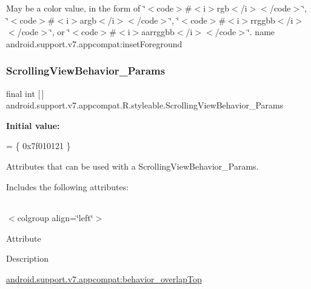 May be a color value, in the form of \char`\"{}$<$code$>$\#$<$i$>$rgb$<$/i$>$$<$/code$>$\char`\"{}, \char`\"{}$<$code$>$\#$<$i$>$argb$<$/i$>$$<$/code$>$\char`\"{}, \char`\"{}$<$code$>$\#$<$i$>$rrggbb$<$/i$>$$<$/code$>$\char`\"{}, or \char`\"{}$<$code$>$\#$<$i$>$aarrggbb$<$/i$>$$<$/code$>$\char`\"{}.  name android.\+support.\+v7.\+appcompat\+:inset\+Foreground \mbox{\label{classandroid_1_1support_1_1v7_1_1appcompat_1_1R_1_1styleable_a0f3b26fd53511c29976d0f2c70a6b4f4}} 
\subsubsection{\texorpdfstring{Scrolling\+View\+Behavior\+\_\+\+Params}{ScrollingViewBehavior\_Params}}
{\footnotesize\ttfamily final int \mbox{[}$\,$\mbox{]} android.\+support.\+v7.\+appcompat.\+R.\+styleable.\+Scrolling\+View\+Behavior\+\_\+\+Params\hspace{0.3cm}{\ttfamily [static]}}

{\bfseries Initial value\+:}
\begin{DoxyCode}
= \{
            0x7f010121
        \}
\end{DoxyCode}
Attributes that can be used with a Scrolling\+View\+Behavior\+\_\+\+Params. 

Includes the following attributes\+:

\tabulinesep=1mm
\begin{longtabu} spread 0pt [c]{*{0}{|X[-1]}|}
\hline
\end{longtabu}
$<$colgroup align=\char`\"{}left\char`\"{}$>$ 

Attribute

Description 

{\ttfamily \hyperlink{classandroid_1_1support_1_1v7_1_1appcompat_1_1R_1_1styleable_abf0bf54a4df691d236a3aa5891732c78}{android.\+support.\+v7.\+appcompat\+:behavior\+\_\+overlap\+Top}}

